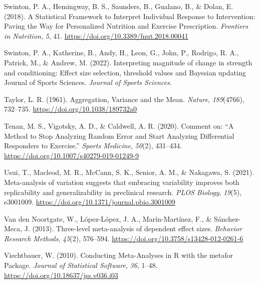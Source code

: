 \documentclass[
]{article}
\newlength{\cslhangindent}
\newlength{\cslentryspacingunit} %
\newenvironment{CSLReferences}[2] %
 {%
  \setlength{\parindent}{0pt}
  \ifodd #1
  \let\oldpar\par
  \def\par{\hangindent=\cslhangindent\oldpar}
  \fi
  \setlength{\parskip}{#2\cslentryspacingunit}
 }%
 {}
\begin{document}
\begin{CSLReferences}{1}{0}
\leavevmode{}%
Swinton, P. A., Hemingway, B. S., Saunders, B., Gualano, B., \& Dolan, E. (2018). A {Statistical} {Framework} to {Interpret} {Individual} {Response} to {Intervention}: {Paving} the {Way} for {Personalized} {Nutrition} and {Exercise} {Prescription}. \emph{Frontiers in Nutrition}, \emph{5}, 41. \url{https://doi.org/10.3389/fnut.2018.00041}

\leavevmode{}%
Swinton, P. A., Katherine, B., Andy, H., Leon, G., John, P., Rodrigo, R. A., Patrick, M., \& Andrew, M. (2022). Interpreting magnitude of change in strength and conditioning: {Effect} size selection, threshold values and {Bayesian} updating {Journal} of {Sports} {Sciences}. \emph{Journal of Sports Sciences}.

\leavevmode{}%
Taylor, L. R. (1961). Aggregation, {Variance} and the {Mean}. \emph{Nature}, \emph{189}(4766), 732--735. \url{https://doi.org/10.1038/189732a0}

\leavevmode{}%
Tenan, M. S., Vigotsky, A. D., \& Caldwell, A. R. (2020). Comment on: {``{A} {Method} to {Stop} {Analyzing} {Random} {Error} and {Start} {Analyzing} {Differential} {Responders} to {Exercise}.''} \emph{Sports Medicine}, \emph{50}(2), 431--434. \url{https://doi.org/10.1007/s40279-019-01249-9}

\leavevmode{}%
Usui, T., Macleod, M. R., McCann, S. K., Senior, A. M., \& Nakagawa, S. (2021). Meta-analysis of variation suggests that embracing variability improves both replicability and generalizability in preclinical research. \emph{PLOS Biology}, \emph{19}(5), e3001009. \url{https://doi.org/10.1371/journal.pbio.3001009}

\leavevmode{}%
Van den Noortgate, W., López-López, J. A., Marín-Martínez, F., \& Sánchez-Meca, J. (2013). Three-level meta-analysis of dependent effect sizes. \emph{Behavior Research Methods}, \emph{45}(2), 576--594. \url{https://doi.org/10.3758/s13428-012-0261-6}

\leavevmode{}%
Viechtbauer, W. (2010). Conducting {Meta}-{Analyses} in {R} with the metafor {Package}. \emph{Journal of Statistical Software}, \emph{36}, 1--48. \url{https://doi.org/10.18637/jss.v036.i03}


\end{CSLReferences}
\end{document}
